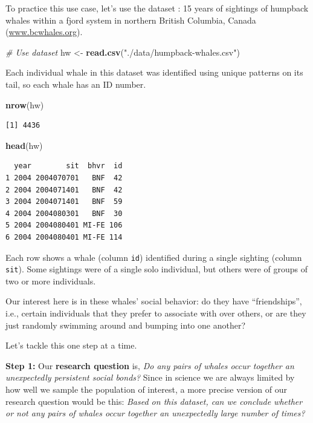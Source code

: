 \documentclass[
]{book}
\newenvironment{Shaded}{\begin{snugshade}}{\end{snugshade}}
\newcommand{\CommentTok}[1]{\textcolor[rgb]{0.56,0.35,0.01}{\textit{#1}}}
\newcommand{\KeywordTok}[1]{\textcolor[rgb]{0.13,0.29,0.53}{\textbf{#1}}}
\newcommand{\NormalTok}[1]{#1}
\newcommand{\StringTok}[1]{\textcolor[rgb]{0.31,0.60,0.02}{#1}}
\begin{document}
To practice this use case, let's use the dataset : 15 years of sightings of humpback whales within a fjord system in northern British Columbia, Canada (\url{www.bcwhales.org}).

\begin{Shaded}
\begin{Highlighting}[]
\CommentTok{# Use dataset}
\NormalTok{hw <-}\StringTok{ }\KeywordTok{read.csv}\NormalTok{(}\StringTok{"./data/humpback-whales.csv"}\NormalTok{)}
\end{Highlighting}
\end{Shaded}

Each individual whale in this dataset was identified using unique patterns on its tail, so each whale has an ID number.

\begin{Shaded}
\begin{Highlighting}[]
\KeywordTok{nrow}\NormalTok{(hw)}
\end{Highlighting}
\end{Shaded}

\begin{verbatim}
[1] 4436
\end{verbatim}

\begin{Shaded}
\begin{Highlighting}[]
\KeywordTok{head}\NormalTok{(hw)}
\end{Highlighting}
\end{Shaded}

\begin{verbatim}
  year        sit  bhvr  id
1 2004 2004070701   BNF  42
2 2004 2004071401   BNF  42
3 2004 2004071401   BNF  59
4 2004 2004080301   BNF  30
5 2004 2004080401 MI-FE 106
6 2004 2004080401 MI-FE 114
\end{verbatim}

Each row shows a whale (column \texttt{id}) identified during a single sighting (column \texttt{sit}). Some sightings were of a single solo individual, but others were of groups of two or more individuals.

Our interest here is in these whales' social behavior: do they have ``friendships'', i.e., certain individuals that they prefer to associate with over others, or are they just randomly swimming around and bumping into one another?

Let's tackle this one step at a time.

\textbf{Step 1:} Our \textbf{research question} is, \emph{Do any pairs of whales occur together an unexpectedly persistent social bonds?} Since in science we are always limited by how well we sample the population of interest, a more precise version of our research question would be this: \emph{Based on this dataset, can we conclude whether or not any pairs of whales occur together an unexpectedly large number of times?}
\end{document}
